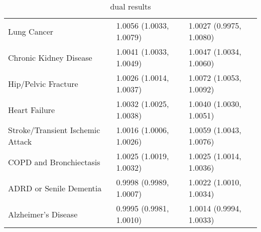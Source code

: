 \begin{table}[ht]
\begin{tabular}{lll}
  Lung Cancer & 1.0056 (1.0033, 1.0079) & 1.0027 (0.9975, 1.0080) \\ 
  Chronic Kidney Disease & 1.0041 (1.0033, 1.0049) & 1.0047 (1.0034, 1.0060) \\ 
  Hip/Pelvic Fracture & 1.0026 (1.0014, 1.0037) & 1.0072 (1.0053, 1.0092) \\ 
  Heart Failure & 1.0032 (1.0025, 1.0038) & 1.0040 (1.0030, 1.0051) \\ 
  Stroke/Transient Ischemic Attack & 1.0016 (1.0006, 1.0026) & 1.0059 (1.0043, 1.0076) \\ 
  COPD and Bronchiectasis & 1.0025 (1.0019, 1.0032) & 1.0025 (1.0014, 1.0036) \\ 
  ADRD or Senile Dementia & 0.9998 (0.9989, 1.0007) & 1.0022 (1.0010, 1.0034) \\ 
  Alzheimer's Disease & 0.9995 (0.9981, 1.0010) & 1.0014 (0.9994, 1.0033) \\ 
   \hline
\end{tabular}
\caption{dual results} 
\label{tab:stratified_OR_dual}
\end{table}
